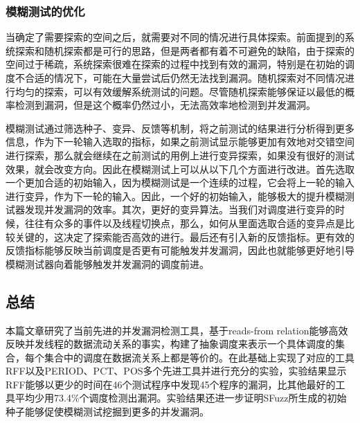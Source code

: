 \subsubsection{模糊测试的优化}

当确定了需要探索的空间之后，就需要对不同的情况进行具体探索。前面提到的系统探索和随机探索都是可行的思路，但是两者都有着不可避免的缺陷，由于探索的空间过于稀疏，系统探索很难在探索的过程中找到有效的漏洞，特别是在初始的调度不合适的情况下，可能在大量尝试后仍然无法找到漏洞。随机探索对不同情况进行均匀的探索，可以有效缓解系统测试的问题。尽管随机探索能够保证以最低的概率检测到漏洞，但是这个概率仍然过小，无法高效率地检测到并发漏洞。

模糊测试通过筛选种子、变异、反馈等机制，将之前测试的结果进行分析得到更多信息，作为下一轮输入选取的指标，如果之前测试显示能够更加有效地对交错空间进行探索，那么就会继续在之前测试的用例上进行变异探索，如果没有很好的测试效果，就会改变方向。因此在模糊测试上可以从以下几个方面进行改进。首先选取一个更加合适的初始输入，因为模糊测试是一个连续的过程，它会将上一轮的输入进行变异，作为下一轮的输入。因此，一个好的初始输入，能够极大的提升模糊测试器发现并发漏洞的效率。其次，更好的变异算法。当我们对调度进行变异的时候，往往有众多的事件以及线程切换点，那么，如何从里面选取合适的变异点是比较关键的，这决定了探索能否高效的进行。最后还有引入新的反馈指标。更有效的反馈指标能够反映当前调度是否更有可能触发并发漏洞，因此也就能够更好地引导模糊测试器向着能够触发并发漏洞的调度前进。

\subsection{总结}

本篇文章研究了当前先进的并发漏洞检测工具，基于reads-from relation能够高效反映并发线程的数据流动关系的事实，构建了抽象调度来表示一个具体调度的集合，每个集合中的调度在数据流关系上都是等价的。在此基础上实现了对应的工具RFF以及PERIOD、PCT、POS多个先进工具并进行充分的实验，实验结果显示RFF能够以更少的时间在46个测试程序中发现45个程序的漏洞，比其他最好的工具平均少用73.4\%个调度检测出漏洞。实验结果还进一步证明SFuzz所生成的初始种子能够促使模糊测试挖掘到更多的并发漏洞。

